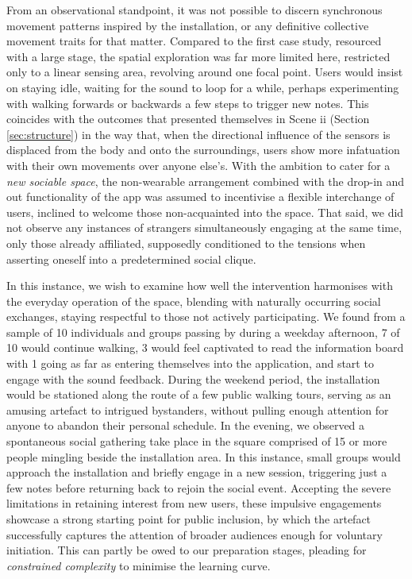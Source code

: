 From an observational standpoint, it was not possible to discern synchronous movement patterns inspired by the installation, or any definitive collective movement traits for that matter. Compared to the first case study, resourced with a large stage, the spatial exploration was far more limited here, restricted only to a linear sensing area, revolving around one focal point. Users would insist on staying idle, waiting for the sound to loop for a while, perhaps experimenting with walking forwards or backwards a few steps to trigger new notes. This coincides with the outcomes that presented themselves in Scene ii (Section \ref{sec:structure}) in the way that, when the directional influence of the sensors is displaced from the body and onto the surroundings, users show more infatuation with their own movements over anyone else's. With the ambition to cater for a \textit{new sociable space}, the non-wearable arrangement combined with the drop-in and out functionality of the app was assumed to incentivise a flexible interchange of users, inclined to welcome those non-acquainted into the space. That said, we did not observe any instances of strangers simultaneously engaging at the same time, only those already affiliated, supposedly conditioned to the tensions when asserting oneself into a predetermined social clique. 

In this instance, we wish to examine how well the intervention harmonises with the everyday operation of the space, blending with naturally occurring social exchanges, staying respectful to those not actively participating. We found from a sample of 10 individuals and groups passing by during a weekday afternoon, 7 of 10 would continue walking, 3 would feel captivated to read the information board with 1 going as far as entering themselves into the application, and start to engage with the sound feedback. During the weekend period, the installation would be stationed along the route of a few public walking tours, serving as an amusing artefact to intrigued bystanders, without pulling enough attention for anyone to abandon their personal schedule. In the evening, we observed a spontaneous social gathering take place in the square comprised of 15 or more people mingling beside the installation area. In this instance, small groups would approach the installation and briefly engage in a new session, triggering just a few notes before returning back to rejoin the social event. Accepting the severe limitations in retaining interest from new users, these impulsive engagements showcase a strong starting point for public inclusion, by which the artefact successfully captures the attention of broader audiences enough for voluntary initiation. This can partly be owed to our preparation stages, pleading for \textit{constrained complexity} to minimise the learning curve.


